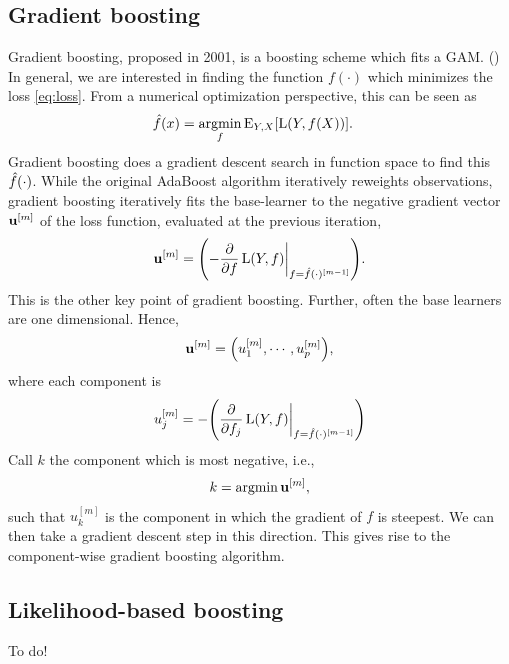 \subsection{Gradient boosting}
Gradient boosting, proposed in 2001, is a boosting scheme which fits a GAM. (\cite{friedman2001}) In general, we are interested in finding the function $f(\cdot)$ which minimizes the loss \eqref{eq:loss}. From a numerical optimization perspective, this can be seen as
\begin{align}
    \hat{f}(x)&=\underset{f}{\operatorname{argmin}}\,{\operatorname{E}_{Y,X}[\operatorname{L}(Y,f(X))]}.
\end{align}
Gradient boosting does a gradient descent search in function space to find this $\hat{f}(\cdot)$. While the original AdaBoost algorithm iteratively reweights observations, gradient boosting iteratively fits the base-learner to the negative gradient vector $\mathbf{u}^{[m]}$ of the loss function, evaluated at the previous iteration,
\begin{align}
    \u^{[m]}=\p*{-\frac{\pd}{\pd f}\loss(Y,f)\at_{f=\fh(\cdot)^{[m-1]}}}.
\end{align}
This is the other key point of gradient boosting. Further, often the base learners are one dimensional. Hence,
\begin{align}
    \u^{[m]}=\p*{u_1^{[m]},\cdots,u_p^{[m]}},
\end{align}
where each component is
\begin{align}
    u_j^{[m]}=-\p*{\frac{\pd}{\pd f_j}\loss(Y,f)\at_{f=\fh(\cdot)^{[m-1]}}}
\end{align}
Call $k$ the component which is most negative, i.e.,
\begin{align}
    k=\operatorname{argmin}{\mathbf{u}^{[m]}},
\end{align}
such that $u_k^{[m]}$ is the component in which the gradient of $f$ is steepest. We can then take a gradient descent step in this direction. This gives rise to the component-wise gradient boosting algorithm.

\subsection{Likelihood-based boosting}
To do!